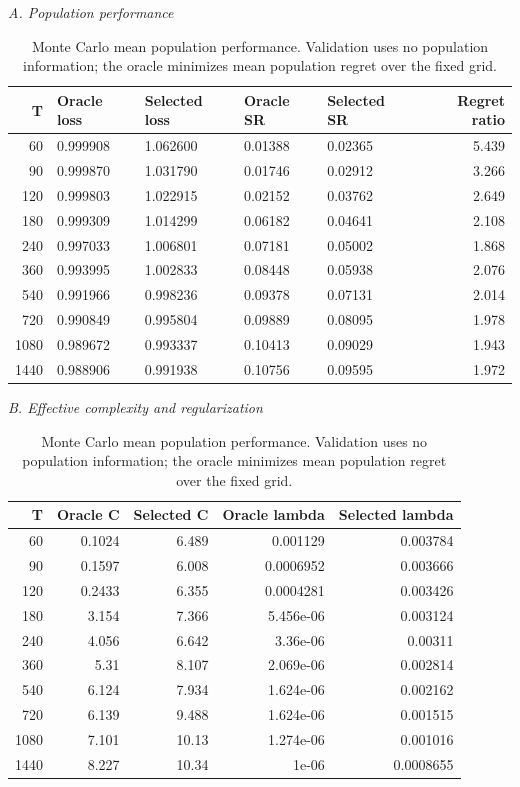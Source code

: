 \begin{table}[p]\centering\small
\caption{Monte Carlo mean population performance. Validation uses no population information; the oracle minimizes mean population regret over the fixed grid.}
\label{tab:sim_main}
\textit{A. Population performance}\par\smallskip
\begin{tabular}{rllllr}
\toprule
T & Oracle loss & Selected loss & Oracle SR & Selected SR & Regret ratio \\
\midrule
60 & 0.999908 & 1.062600 & 0.01388 & 0.02365 & 5.439 \\
90 & 0.999870 & 1.031790 & 0.01746 & 0.02912 & 3.266 \\
120 & 0.999803 & 1.022915 & 0.02152 & 0.03762 & 2.649 \\
180 & 0.999309 & 1.014299 & 0.06182 & 0.04641 & 2.108 \\
240 & 0.997033 & 1.006801 & 0.07181 & 0.05002 & 1.868 \\
360 & 0.993995 & 1.002833 & 0.08448 & 0.05938 & 2.076 \\
540 & 0.991966 & 0.998236 & 0.09378 & 0.07131 & 2.014 \\
720 & 0.990849 & 0.995804 & 0.09889 & 0.08095 & 1.978 \\
1080 & 0.989672 & 0.993337 & 0.10413 & 0.09029 & 1.943 \\
1440 & 0.988906 & 0.991938 & 0.10756 & 0.09595 & 1.972 \\
\bottomrule
\end{tabular}
\par\medskip
\textit{B. Effective complexity and regularization}\par\smallskip
\begin{tabular}{rrrrr}
\toprule
T & Oracle C & Selected C & Oracle lambda & Selected lambda \\
\midrule
60 & 0.1024 & 6.489 & 0.001129 & 0.003784 \\
90 & 0.1597 & 6.008 & 0.0006952 & 0.003666 \\
120 & 0.2433 & 6.355 & 0.0004281 & 0.003426 \\
180 & 3.154 & 7.366 & 5.456e-06 & 0.003124 \\
240 & 4.056 & 6.642 & 3.36e-06 & 0.00311 \\
360 & 5.31 & 8.107 & 2.069e-06 & 0.002814 \\
540 & 6.124 & 7.934 & 1.624e-06 & 0.002162 \\
720 & 6.139 & 9.488 & 1.624e-06 & 0.001515 \\
1080 & 7.101 & 10.13 & 1.274e-06 & 0.001016 \\
1440 & 8.227 & 10.34 & 1e-06 & 0.0008655 \\
\bottomrule
\end{tabular}
\par\medskip
\end{table}
